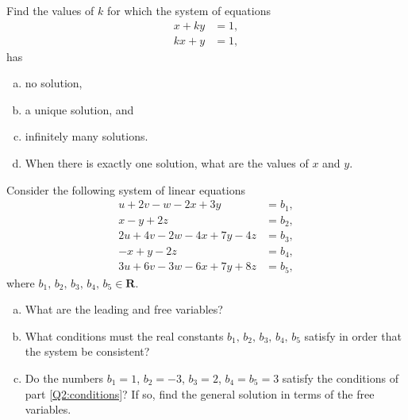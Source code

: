 \documentclass[a4paper,11pt]{article}
\newcommand{\R}{\mathbf{R}}
\begin{document}
 Find the values of $k$ for which the system of
equations
\begin{align*}
  x + ky &= 1, \\
  kx + y &= 1,
\end{align*}
has
\begin{enumerate}[(a)]
\item no solution,
\item a unique solution, and
\item infinitely many solutions.
\item When there is exactly one solution, what are the values of $x$ and $y$. \\
\end{enumerate}


 Consider the following system of linear equations
\begin{align*}
  u+2v-w-2x+3y &= b_1, \\
  x-y+2z &= b_2, \\
  2u+4v-2w-4x+7y-4z &= b_3, \\
  -x+y-2z &= b_4, \\
  3u+6v-3w-6x+7y+8z &= b_5,
\end{align*}
where $b_1,\,b_2,\,b_3,\,b_4,\,b_5 \in \R$.
\begin{enumerate}[(a)]
\item What are the leading and free variables?
\item\label{Q2:conditions} What conditions must the real constants
  $b_1,\,b_2,\,b_3,\,b_4,\,b_5$ satisfy in order that the system be consistent?
\item Do the numbers $b_1=1$, $b_2=-3$, $b_3=2$, $b_4=b_5=3$ satisfy the
  conditions of part \ref{Q2:conditions}? If so, find the general solution in
  terms of the free variables.
\end{enumerate}
\end{document}
